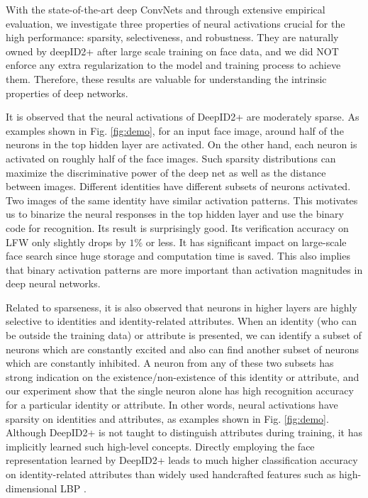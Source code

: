 \documentclass[10pt,twocolumn,letterpaper]{article}
\begin{document}
With the state-of-the-art deep ConvNets and through extensive empirical evaluation, we investigate three properties of  neural activations crucial for  the high performance: sparsity, selectiveness, and robustness. They are naturally owned by deepID2+ after large scale training on face data, and we did NOT enforce any extra regularization to the model and training process to achieve them. Therefore, these results are valuable for understanding the intrinsic properties of deep  networks.

It is observed that the neural activations of DeepID2+ are moderately sparse. As examples shown in Fig. \ref{fig:demo}, for an input face image, around half of the neurons in the top hidden layer are activated. On the other hand, each neuron is activated on roughly half of the face images. Such sparsity distributions can maximize the discriminative power of  the deep net as well as the distance between images. Different identities have different subsets of neurons activated. Two images of the same identity have similar activation patterns. This motivates us to binarize the neural responses in the top hidden layer and  use the binary code for  recognition. Its result is surprisingly good. Its verification accuracy on LFW only slightly drops by $1\%$ or less. It has significant impact on large-scale face search since huge storage and computation time is saved. This also implies that binary activation patterns are more important than activation magnitudes in deep neural networks.

Related to sparseness, it is also observed that neurons in higher layers are highly selective to identities and identity-related attributes. When an identity (who can be outside the training data) or attribute is presented, we can identify a subset of neurons which are constantly excited and also can find another subset of neurons which are constantly inhibited. A neuron from any of these two subsets has strong indication on the existence/non-existence of this identity or attribute, and our experiment show that the single neuron alone has high recognition accuracy for a particular identity or attribute. In other words, neural activations have sparsity on identities and attributes, as examples shown in Fig. \ref{fig:demo}. Although  DeepID2+  is not taught to distinguish attributes during training, it has implicitly learned such high-level concepts. Directly employing the face representation learned by DeepID2+ leads to much higher classification accuracy on identity-related attributes than widely used handcrafted features such as high-dimensional LBP \cite{chen2013,cao2013}.
\end{document}
